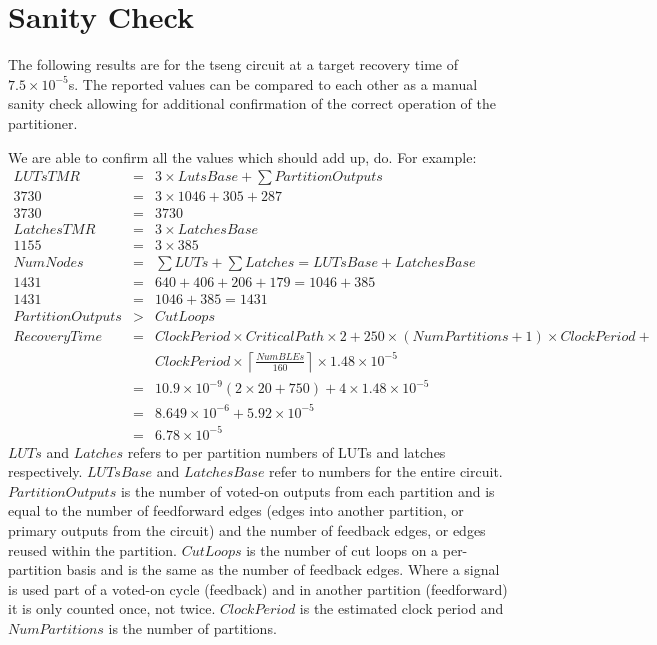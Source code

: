 \documentclass[12pt,final,oneside,a4paper]{dwThesis} %
\begin{document}



   \section{Sanity Check}
   \label{resSanity} The following results are for the
   tseng circuit at a target recovery time of $7.5\times10^{-5}$s. The reported
   values can be compared to each other as a manual sanity check allowing for
   additional confirmation of the correct operation of the partitioner.

   We are able to confirm all the values which should add up, do. For example:
   \begin{eqnarray*}
      LUTsTMR &=& 3\times LutsBase + \sum PartitionOutputs\\
      3730 &=& 3\times1046 + 305 + 287\\
      3730 &=& 3730\\
      LatchesTMR &=&  3\times LatchesBase\\
      1155 &=& 3\times385\\
      NumNodes &=& \sum LUTs+\sum Latches = LUTsBase+LatchesBase \\
      1431 &=& 640+406+206+179 = 1046+385\\
      1431 &=& 1046 + 385 = 1431\\
      PartitionOutputs &>& CutLoops\\
      RecoveryTime &=&
      ClockPeriod\times CriticalPath\times 2 + 250\times(NumPartitions+1)\times
      ClockPeriod + \\
      & &ClockPeriod\times \left\lceil
      \frac{NumBLEs}{160}\right\rceil\times 1.48\times10^{-5}\\
      &=&
      10.9\times10^{-9}(2\times20+750)+4\times1.48\times10^{-5}\\
      &=&
      8.649\times10^{-6}+5.92\times10^{-5}\\
      &=& 6.78\times10^{-5}
   \end{eqnarray*}
   $LUTs$ and $Latches$ refers to per partition numbers of \glspl{LUT} and latches respectively. $LUTsBase$ and $LatchesBase$ refer to numbers for the entire circuit.
   $PartitionOutputs$ is the number of voted-on outputs from each partition and is equal to the number of feedforward edges (edges into another partition, or primary outputs from the circuit) and the number of feedback edges, or edges reused within the partition. $CutLoops$ is the number of cut loops on a per-partition basis and is the same as the number of feedback edges. Where a signal is used part of a voted-on cycle (feedback) and in another partition (feedforward) it is only counted once, not twice.
   $ClockPeriod$ is the estimated clock period and $NumPartitions$ is the number of partitions.
   
\end{document}
